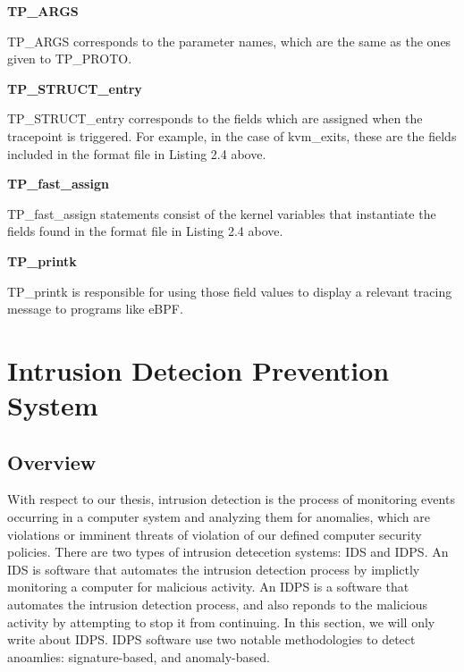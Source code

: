 \documentclass{report}
\begin{document}
\begin{spacing}{1.5}
{\large
\textbf{TP\_ARGS}
\leavevmode\newline
}

{\large
TP\_ARGS corresponds to the parameter names, which are the same as the ones given to TP\_PROTO.
\newline
}

{\large
\textbf{TP\_STRUCT\_entry}
\leavevmode\newline
}

{\large
TP\_STRUCT\_entry corresponds to the fields which are assigned when the tracepoint is triggered. For example, in the case of kvm\_exits, these are the fields included in the format file in Listing 2.4 above.
\newline
}


{\large
\textbf{TP\_fast\_assign}
\leavevmode\newline
}

{\large
TP\_fast\_assign statements consist of the kernel variables that instantiate the fields found in the format file in Listing 2.4 above. 
\newline
}

{\large
\textbf{TP\_printk}
\leavevmode\newline
}

{\large
TP\_printk is responsible for using those field values to display a relevant tracing message to programs like eBPF.
\newline
}

\section{Intrusion Detecion Prevention System}

\subsection{Overview}

{\large
With respect to our thesis, intrusion detection is the process of monitoring events occurring in a computer system and analyzing them for anomalies, which are violations or imminent threats of violation of our defined computer security policies. There are two types of intrusion detecetion systems: IDS and IDPS. An IDS is software that automates the intrusion detection process by implictly monitoring a computer for malicious activity. An IDPS is a software that automates the intrusion detection process, and also reponds to the malicious activity by attempting to stop it from continuing. In this section, we will only write about IDPS. IDPS software use two notable methodologies to detect anoamlies: signature-based, and anomaly-based.
\newline
}



\end{spacing}
\end{document}
